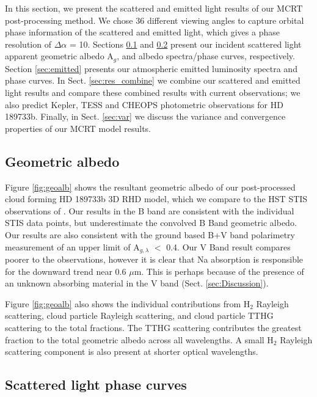 \documentclass{aa}
\begin{document}
In this section, we present the scattered and emitted light results of our MCRT post-processing method.
We chose 36 different viewing angles to capture orbital phase information of the scattered and emitted light, which gives a phase resolution of $\Delta\alpha$ = 10\degr.
Sections \ref{sec:geoalb} and \ref {sec:scatcurves} present our incident scattered light apparent geometric albedo A$_{g}$, and albedo spectra/phase curves, respectively. 
Section \ref{sec:emitted} presents our atmospheric emitted luminosity spectra and phase curves.
In Sect. \ref{sec:res_combine} we combine our scattered and emitted light results and compare these combined results with current observations; we also predict Kepler, TESS and CHEOPS photometric observations for HD 189733b.
Finally, in Sect. \ref{sec:var} we discuss the variance and convergence properties of our MCRT model results.

\subsection{Geometric albedo}
\label{sec:geoalb}

Figure \ref{fig:geoalb} shows the resultant geometric albedo of our post-processed cloud forming HD 189733b 3D RHD model, which we compare to the HST STIS observations of \citet{Evans2013}.
Our results in the B band are consistent with the individual STIS data points, but underestimate the convolved B Band geometric albedo.
Our results are also consistent with the \citet{Wiktotowicz2015} ground based B+V band polarimetry measurement of an upper limit of A$_{g, \lambda}$ $<$ 0.4.
Our V Band result compares poorer to the observations, however it is clear that Na absorption is responsible for the downward trend near 0.6 $\mu$m.
This is perhaps because of the presence of an unknown absorbing material in the V band (Sect. \ref{sec:Discussion}).

Figure \ref{fig:geoalb} also shows the individual contributions from H$_{2}$ Rayleigh scattering, cloud particle Rayleigh scattering, and cloud particle TTHG scattering to the total fractions.
The TTHG scattering contributes the greatest fraction to the total geometric albedo across all wavelengths.
A small H$_{2}$ Rayleigh scattering component is also present at shorter optical wavelengths.

\subsection{Scattered light phase curves}
\label{sec:scatcurves}
\end{document}
